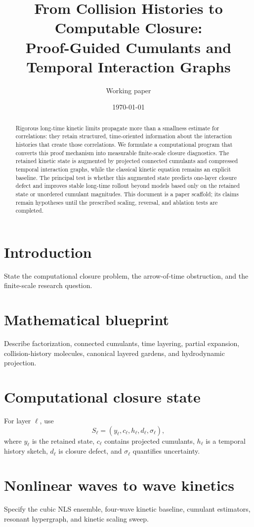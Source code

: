 \documentclass[11pt]{article}
\title{From Collision Histories to Computable Closure:\\
Proof-Guided Cumulants and Temporal Interaction Graphs}
\author{Working paper}
\date{\today}
\begin{document}
\maketitle

\begin{abstract}
Rigorous long-time kinetic limits propagate more than a smallness estimate for
correlations: they retain structured, time-oriented information about the
interaction histories that create those correlations. We formulate a
computational program that converts this proof mechanism into measurable
finite-scale closure diagnostics. The retained kinetic state is augmented by
projected connected cumulants and compressed temporal interaction graphs, while
the classical kinetic equation remains an explicit baseline. The principal
test is whether this augmented state predicts one-layer closure defect and
improves stable long-time rollout beyond models based only on the retained state
or unordered cumulant magnitudes. This document is a paper scaffold; its claims
remain hypotheses until the prescribed scaling, reversal, and ablation tests are
completed.
\end{abstract}

\section{Introduction}
State the computational closure problem, the arrow-of-time obstruction, and
the finite-scale research question.

\section{Mathematical blueprint}
Describe factorization, connected cumulants, time layering, partial expansion,
collision-history molecules, canonical layered gardens, and hydrodynamic
projection.

\section{Computational closure state}
For layer $\ell$, use
\[
S_\ell=(y_\ell,c_\ell,h_\ell,d_\ell,\sigma_\ell),
\]
where $y_\ell$ is the retained state, $c_\ell$ contains projected cumulants,
$h_\ell$ is a temporal history sketch, $d_\ell$ is closure defect, and
$\sigma_\ell$ quantifies uncertainty.

\section{Nonlinear waves to wave kinetics}
Specify the cubic NLS ensemble, four-wave kinetic baseline, cumulant estimators,
resonant hypergraph, and kinetic scaling sweep.
\end{document}
